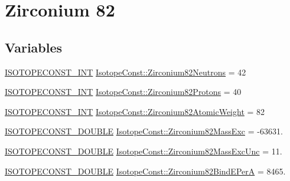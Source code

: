 \hypertarget{group___isotope_const-_zirconium-_zr82}{}\section{Zirconium 82}
\label{group___isotope_const-_zirconium-_zr82}
\subsection*{Variables}
\begin{DoxyCompactItemize}
\item 
\mbox{\hyperlink{group___isotope_const-_macros_ga5f18360b3e99483a35c32d789e62621c}{I\+S\+O\+T\+O\+P\+E\+C\+O\+N\+S\+T\+\_\+\+I\+NT}} \mbox{\hyperlink{group___isotope_const-_zirconium-_zr82_ga2c4283954ce1032815b5a64a47ed72a5}{Isotope\+Const\+::\+Zirconium82\+Neutrons}} = 42
\item 
\mbox{\hyperlink{group___isotope_const-_macros_ga5f18360b3e99483a35c32d789e62621c}{I\+S\+O\+T\+O\+P\+E\+C\+O\+N\+S\+T\+\_\+\+I\+NT}} \mbox{\hyperlink{group___isotope_const-_zirconium-_zr82_gaccf54cb4b7c7adba0b402fc32cda4448}{Isotope\+Const\+::\+Zirconium82\+Protons}} = 40
\item 
\mbox{\hyperlink{group___isotope_const-_macros_ga5f18360b3e99483a35c32d789e62621c}{I\+S\+O\+T\+O\+P\+E\+C\+O\+N\+S\+T\+\_\+\+I\+NT}} \mbox{\hyperlink{group___isotope_const-_zirconium-_zr82_ga131820ad471dac1b8ff62f6b93953238}{Isotope\+Const\+::\+Zirconium82\+Atomic\+Weight}} = 82
\item 
\mbox{\hyperlink{group___isotope_const-_macros_ga8f45a7272ce02c0b4c65c44636ed719a}{I\+S\+O\+T\+O\+P\+E\+C\+O\+N\+S\+T\+\_\+\+D\+O\+U\+B\+LE}} \mbox{\hyperlink{group___isotope_const-_zirconium-_zr82_ga77598962072a93e2fdcb25698a541f0f}{Isotope\+Const\+::\+Zirconium82\+Mass\+Exc}} = -\/63631.
\item 
\mbox{\hyperlink{group___isotope_const-_macros_ga8f45a7272ce02c0b4c65c44636ed719a}{I\+S\+O\+T\+O\+P\+E\+C\+O\+N\+S\+T\+\_\+\+D\+O\+U\+B\+LE}} \mbox{\hyperlink{group___isotope_const-_zirconium-_zr82_gac3fc1b6f99761dcc73e9960136f3dd8d}{Isotope\+Const\+::\+Zirconium82\+Mass\+Exc\+Unc}} = 11.
\item 
\mbox{\hyperlink{group___isotope_const-_macros_ga8f45a7272ce02c0b4c65c44636ed719a}{I\+S\+O\+T\+O\+P\+E\+C\+O\+N\+S\+T\+\_\+\+D\+O\+U\+B\+LE}} \mbox{\hyperlink{group___isotope_const-_zirconium-_zr82_ga274ebd0cb54b40da207666c2cf84835f}{Isotope\+Const\+::\+Zirconium82\+Bind\+E\+PerA}} = 8465.
\item 

\end{DoxyCompactItemize}
